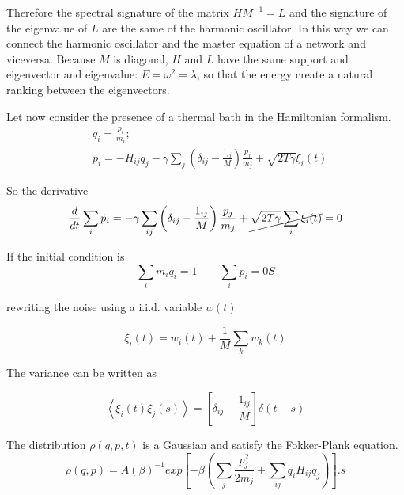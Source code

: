 Therefore the spectral signature of the matrix $HM^{-1} = L$ and the signature  of the eigenvalue of $L$ are the same of the harmonic oscillator. In this way we can connect the harmonic oscillator and the master equation of a network and viceversa. Because $M$ is diagonal, $H$ and $L$ have the same support and eigenvector and eigenvalue: $E = \omega^2 = \lambda$, so that the energy create a natural ranking between the eigenvectors.

Let now consider the presence of a thermal bath in the Hamiltonian formalism.
\begin{equation}
    \begin{aligned}
        &\dot q_i = \frac{p_i}{m_i}; \\
        &\dot p_i  = -H_{ij}q_j - \gamma \sum_j \left(\delta_{ij} - \frac{1_{ij}}{M}\right)\frac{p_j}{m_j} + \sqrt{2T\gamma}\xi_i(t)
    \end{aligned}
\end{equation}

So the derivative 
\begin{equation}
    \begin{aligned}
        \frac{d}{dt} \sum_i \dot p_i = - \gamma \sum_{ij}\left(\delta_{ij} - \frac{1_{ij}}{M}\right) \frac{p_j}{m_j} + \cancel{\sqrt{2T\gamma}\sum_i\xi_i(t)} = 0
    \end{aligned}
\end{equation}

If the initial condition is 
\begin{equation}
    \sum_i m_i q_i = 1 \qquad \sum_i p_i = 0 S
\end{equation}

rewriting the noise using a i.i.d. variable $w(t)$

\begin{equation}
    \xi_i(t) = w_i (t) + \frac{1}{M} \sum_k w_k(t)
\end{equation}

The variance can be written as

\begin{equation}
    \left<\xi_i(t)\xi_j(s)\right> = \left[\delta_{ij} - \frac{1_{ij}}{M}\right]\delta(t-s)
\end{equation}

The distribution $\rho(q,p,t)$ is a Gaussian and satisfy the Fokker-Plank equation.
\begin{equation}
    \rho(q,p) = A(\beta)^{-1} exp\left[ -\beta \left( \sum_j \frac{p_j^2}{2m_j} + \sum_{ij} q_iH_{ij}q_j\right)\right] .s
\end{equation}

